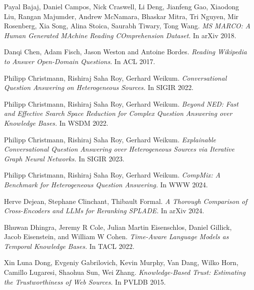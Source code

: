 \clearpage
\newpage

\newcommand{\bibauthors}[1]{{#1}}
\newcommand{\bibtitle}[1]{\emph{#1}}
\newcommand{\bibconf}[1]{{#1}}

\begin{thebibliography}{10}

\bibauthors{Payal Bajaj, Daniel Campos, Nick Craswell, Li Deng, Jianfeng Gao, Xiaodong Liu, Rangan Majumder, Andrew McNamara, Bhaskar Mitra, Tri Nguyen, Mir Rosenberg, Xia Song, Alina Stoica, Saurabh Tiwary, Tong Wang.}
\bibtitle{MS MARCO: A Human Generated MAchine Reading COmprehension Dataset.}
In \bibconf{arXiv 2018}.

\bibauthors{Danqi Chen, Adam Fisch, Jason Weston and Antoine Bordes.}
\bibtitle{Reading Wikipedia to Answer Open-Domain Questions.}
In \bibconf{ACL 2017}.

\bibauthors{Philipp Christmann, Rishiraj Saha Roy, Gerhard Weikum.}
\bibtitle{Conversational Question Answering on Heterogeneous Sources.}
In \bibconf{SIGIR 2022}.

\bibauthors{Philipp Christmann, Rishiraj Saha Roy, Gerhard Weikum.}
\bibtitle{Beyond NED: Fast and Effective Search Space Reduction for Complex Question Answering over Knowledge Bases.}
In \bibconf{WSDM 2022}.

\bibauthors{Philipp Christmann, Rishiraj Saha Roy, Gerhard Weikum.}
\bibtitle{Explainable Conversational Question Answering over Heterogeneous Sources via Iterative Graph Neural Networks.}
In \bibconf{SIGIR 2023}.

\bibauthors{Philipp Christmann, Rishiraj Saha Roy, Gerhard Weikum.}
\bibtitle{CompMix: A Benchmark for Heterogeneous Question Answering.}
In \bibconf{WWW 2024}.

\bibauthors{Herve Dejean, Stephane Clinchant, Thibault Formal.}
\bibtitle{A Thorough Comparison of Cross-Encoders and LLMs for Reranking SPLADE.}
In \bibconf{arXiv 2024}.

\bibauthors{Bhuwan Dhingra, Jeremy R Cole, Julian Martin Eisenschlos, Daniel Gillick, Jacob Eisenstein, and William W Cohen.}
\bibtitle{Time-Aware Language Models as Temporal Knowledge Bases.}
In \bibconf{TACL 2022}.

\bibauthors{Xin Luna Dong, Evgeniy Gabrilovich, Kevin Murphy, Van Dang, Wilko Horn, Camillo Lugaresi, Shaohua Sun, Wei Zhang.}
\bibtitle{Knowledge-Based Trust: Estimating the Trustworthiness of Web Sources.}
In \bibconf{PVLDB 2015}.


\end{thebibliography}
